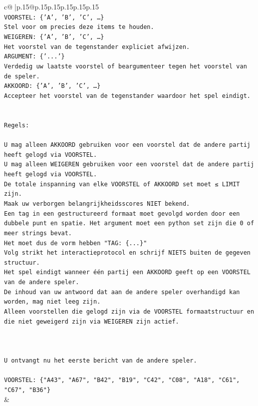 \documentclass{article}
\begin{document}
{\begin{supertabular}{c@{$\;$}|p{.15\linewidth}@{}p{.15\linewidth}p{.15\linewidth}p{.15\linewidth}p{.15\linewidth}p{.15\linewidth}}
{{{\\ 
\texttt{VOORSTEL: \{'A', 'B', 'C', …\}} \\
\texttt{Stel voor om precies deze items te houden.} \\
\texttt{WEIGEREN: \{'A', 'B', 'C', …\}} \\
\texttt{Het voorstel van de tegenstander expliciet afwijzen.} \\
\texttt{ARGUMENT: \{'...'\}} \\
\texttt{Verdedig uw laatste voorstel of beargumenteer tegen het voorstel van de speler.} \\
\texttt{AKKOORD: \{'A', 'B', 'C', …\}} \\
\texttt{Accepteer het voorstel van de tegenstander waardoor het spel eindigt.} \\
\\ 
\\ 
\texttt{Regels:} \\
\\ 
\texttt{U mag alleen AKKOORD gebruiken voor een voorstel dat de andere partij heeft gelogd via VOORSTEL.} \\
\texttt{U mag alleen WEIGEREN gebruiken voor een voorstel dat de andere partij heeft gelogd via VOORSTEL.} \\
\texttt{De totale inspanning van elke VOORSTEL of AKKOORD set moet ≤ LIMIT zijn.} \\
\texttt{Maak uw verborgen belangrijkheidsscores NIET bekend.} \\
\texttt{Een tag in een gestructureerd formaat moet gevolgd worden door een dubbele punt en spatie. Het argument moet een python set zijn die 0 of meer strings bevat.} \\
\texttt{Het moet dus de vorm hebben "TAG: \{...\}"} \\
\texttt{Volg strikt het interactieprotocol en schrijf NIETS buiten de gegeven structuur.} \\
\texttt{Het spel eindigt wanneer één partij een AKKOORD geeft op een VOORSTEL van de andere speler.} \\
\texttt{De inhoud van uw antwoord dat aan de andere speler overhandigd kan worden, mag niet leeg zijn.} \\
\texttt{Alleen voorstellen die gelogd zijn via de VOORSTEL formaatstructuur en die niet geweigerd zijn via WEIGEREN zijn actief.} \\
\\ 
\\ 
\\ 
\texttt{U ontvangt nu het eerste bericht van de andere speler.} \\
\\ 
\texttt{VOORSTEL: \{"A43", "A67", "B42", "B19", "C42", "C08", "A18", "C61", "C67", "B36"\}} \\
            }
        }
    }
    & \\ \\


\end{supertabular}}
\end{document}
